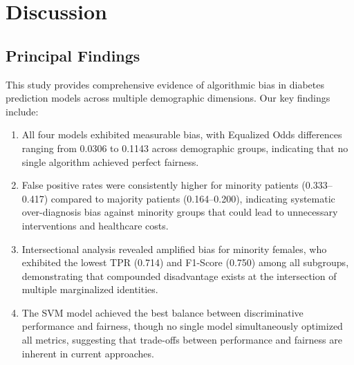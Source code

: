 
\section{Discussion}

\subsection{Principal Findings}

This study provides comprehensive evidence of algorithmic bias in diabetes 
prediction models across multiple demographic dimensions. Our key findings 
include:

\begin{enumerate}[leftmargin=*]
    \item All four models exhibited measurable bias, with Equalized Odds 
          differences ranging from 0.0306 to 0.1143 across demographic groups, 
          indicating that no single algorithm achieved perfect fairness.
    \item False positive rates were consistently higher for minority patients 
          (0.333--0.417) compared to majority patients (0.164--0.200), 
          indicating systematic over-diagnosis bias against minority groups 
          that could lead to unnecessary interventions and healthcare costs.
    \item Intersectional analysis revealed amplified bias for minority females, 
          who exhibited the lowest TPR (0.714) and F1-Score (0.750) among 
          all subgroups, demonstrating that compounded disadvantage exists at 
          the intersection of multiple marginalized identities.
    \item The SVM model achieved the best balance between discriminative 
          performance and fairness, though no single model simultaneously 
          optimized all metrics, suggesting that trade-offs between 
          performance and fairness are inherent in current approaches.
\end{enumerate}

